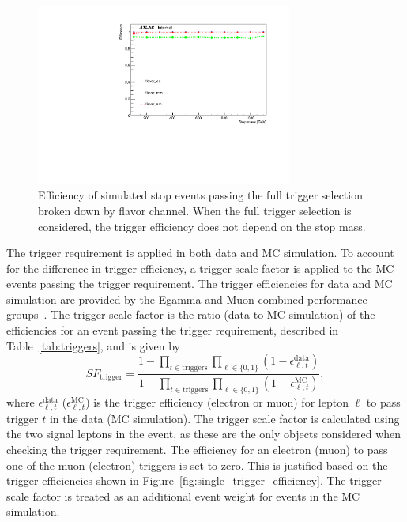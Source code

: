 \begin{figure}[ht]
  \centering
  \includegraphics[width=0.75\textwidth]
    {figs/trigger/EF_e24vhi_medium1_OR_EF_e60_medium1_OR_EF_mu24i_tight_OR_EF_mu36_tight.pdf}
  \caption{Efficiency of simulated stop events passing the full trigger
    selection broken down by flavor channel.
    When the full trigger selection is considered, the trigger efficiency does
    not depend on the stop mass.
  }
  \label{fig:full_trigger_efficiency}
\end{figure}

The trigger requirement is applied in both data and MC simulation.
To account for the difference in trigger efficiency, a trigger scale factor is
applied to the MC events passing the trigger requirement.
The trigger efficiencies for data and MC simulation are provided by
the Egamma and Muon combined performance
groups~\cite{ATLAS-CONF-2014-032,Aad:2014rra}.
The trigger scale factor is the ratio (data to MC simulation) of the
efficiencies for an event passing the trigger requirement, described in
Table~\ref{tab:triggers}, and is given by
\begin{equation}
  SF_\mathrm{trigger} =
  \frac{1- \prod_{t \in \mathrm{triggers}}\prod_{\ell \in \{0,1\}}
                 (1-\epsilon_{\ell, t}^\mathrm{data})}
       {1- \prod_{t \in \mathrm{triggers}}\prod_{\ell \in \{0,1\}}
                 (1-\epsilon_{\ell, t}^\mathrm{MC})},
\end{equation}
where $\epsilon_{\ell,t}^\mathrm{data}$ ($\epsilon_{\ell,t}^\mathrm{MC}$) is
the trigger efficiency (electron or muon) for lepton $\ell$ to pass trigger $t$
in the data (MC simulation).
The trigger scale factor is calculated using the two signal leptons in the
event, as these are the only objects considered when checking the trigger
requirement.
The efficiency for an electron (muon) to pass one of the muon (electron)
triggers is set to zero.
This is justified based on the trigger efficiencies shown in
Figure~\ref{fig:single_trigger_efficiency}.
The trigger scale factor is treated as an additional event weight for events in
the MC simulation.

